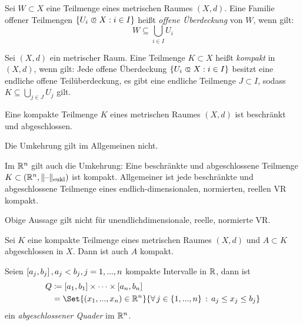 \documentclass{cheat-sheet}
\begin{document}
\begin{defn}
  Sei $W \subset X$ eine Teilmenge eines metrischen Raumes $(X, d)$. Eine Familie offener Teilmengen $\{ U_i \opn X : i \in I \}$ heißt \emph{offene Überdeckung} von $W$, wenn gilt:
  \[ W \subseteq \bigcup_{i \in I} U_i \]
\end{defn}

\begin{defn}
  Sei $(X, d)$ ein metrischer Raum. Eine Teilmenge $K \subset X$ heißt \emph{kompakt} in $(X, d)$, wenn gilt: Jede offene Überdeckung $\{ U_i \opn X : i \in I \}$ besitzt eine endliche offene Teilüberdeckung, \dh{} es gibt eine endliche Teilmenge $J \subset I$, sodass $K \subseteq \bigcup_{j \in J} U_j$ gilt.
\end{defn}


\begin{satz}
  Eine kompakte Teilmenge $K$ eines metrischen Raumes $(X, d)$ ist beschränkt und abgeschlossen.
\end{satz}

\begin{acht}
  Die Umkehrung gilt im Allgemeinen nicht.
\end{acht}

\begin{satz}
  Im $\mathbb{R}^n$ gilt auch die Umkehrung: Eine beschränkte und abgeschlossene Teilmenge $K \subset (\mathbb{R}^n, \lVert\text{--}\rVert_\text{eukl})$ ist kompakt. Allgemeiner ist jede beschränkte und abgeschlossene Teilmenge eines endlich-dimensionalen, normierten, reellen VR kompakt.
\end{satz}

\begin{acht}
  Obige Aussage gilt nicht für unendlichdimensionale, reelle, normierte VR.
\end{acht}


\begin{satz}
  Sei $K$ eine kompakte Teilmenge eines metrischen Raumes $(X, d)$ und $A \subset K$ abgeschlossen in $X$. Dann ist auch $A$ kompakt.
\end{satz}

\begin{defn}
  Seien $\left[ a_j, b_j \right], a_j < b_j, j = 1, ..., n$ kompakte Intervalle in $\mathbb{R}$, dann ist
  \begin{align*}
    Q &\coloneqq \cinterval{a_1}{b_1} \times \cdots \times \cinterval{a_n}{b_n}\\
    &= \Set{ (x_1, ..., x_n) \in \R^n }{ \fa{j \in \{ 1, ..., n \}} a_j \le x_j \le b_j }
  \end{align*}
  ein \emph{abgeschlossener Quader} im $\mathbb{R}^n$.
\end{defn}
\end{document}
